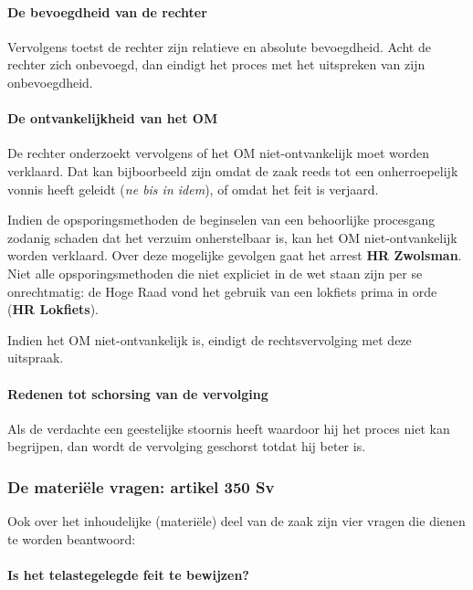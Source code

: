 \documentclass{article}
\begin{document}
\paragraph{De bevoegdheid van de rechter}

Vervolgens toetst de rechter zijn relatieve en absolute bevoegdheid. Acht de
rechter zich onbevoegd, dan eindigt het proces met het uitspreken van zijn
onbevoegdheid.

\paragraph{De ontvankelijkheid van het OM}

De rechter onderzoekt vervolgens of het OM niet-ontvankelijk moet worden
verklaard. Dat kan bijboorbeeld zijn omdat de zaak reeds tot een onherroepelijk
vonnis heeft geleidt (\emph{ne bis in idem}), of omdat het feit is verjaard.

Indien de opsporingsmethoden de beginselen van een behoorlijke procesgang
zodanig schaden dat het verzuim onherstelbaar is, kan het OM niet-ontvankelijk
worden verklaard. Over deze mogelijke gevolgen gaat het arrest \textbf{HR
Zwolsman}. Niet alle opsporingsmethoden die niet expliciet in de wet staan
zijn per se onrechtmatig: de Hoge Raad vond het gebruik van een lokfiets prima
in orde (\textbf{HR Lokfiets}).

Indien het OM niet-ontvankelijk is, eindigt de rechtsvervolging met deze
uitspraak.

\paragraph{Redenen tot schorsing van de vervolging}
Als de verdachte een geestelijke stoornis heeft waardoor hij het proces niet
kan begrijpen, dan wordt de vervolging geschorst totdat hij beter is.

\subsubsection{De materi\"ele vragen: artikel 350 Sv}

Ook over het inhoudelijke (materi\"ele) deel van de zaak zijn vier vragen die
dienen te worden beantwoord:

\paragraph{Is het telastegelegde feit te bewijzen?}
\end{document}
